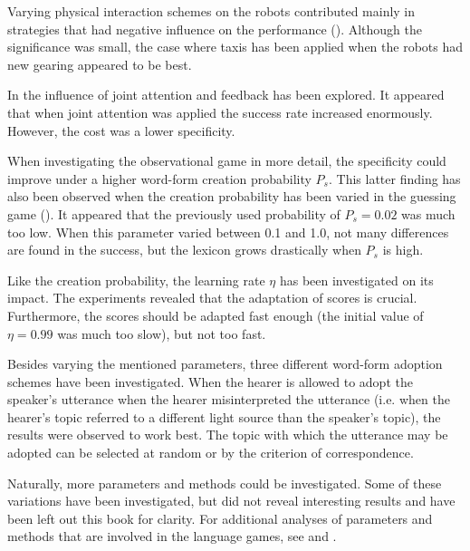 Varying physical interaction schemes on the robots contributed mainly in stra\-tegies that had negative influence on the performance (). Although the significance was small, the case where taxis has been applied when the robots had new gearing appeared to be best.

In  the influence of joint attention and feedback has been explored. It appeared that when joint attention was applied the success rate increased enormously. However, the cost was a lower specificity.

When investigating the observational game in more detail, the specificity could improve under a higher word-form creation probability $P_s$. This latter finding has also been observed when the creation probability has been varied in the guessing game (). It appeared that the previously used probability of $P_s=0.02$ was much too low. When this parameter varied between 0.1 and 1.0, not many differences are found in the success, but the lexicon grows drastically when $P_s$ is high.

Like the creation probability, the learning rate $\eta$ has been investigated on its impact. The experiments revealed that the adaptation of scores is crucial. Furthermore, the scores should be adapted fast enough (the initial value of $\eta=0.99$ was much too slow), but not too fast.

Besides varying the mentioned parameters, three different word-form adoption schemes have been investigated. When the hearer is allowed to adopt the speaker's utterance when the hearer misinterpreted the utterance (i.e. when the hearer's topic referred to a different light source than the speaker's topic), the results were observed to work best. The topic with which the utterance may be adopted can be selected at random or by the criterion of correspondence. 


Naturally, more parameters and methods could be investigated. Some of these variations have been investigated, but did not reveal interesting results and have been left out this book for clarity. For additional analyses of parameters and methods that are involved in the language games, see \cite{dejong:2000} and \cite{kaplan:2000}.

